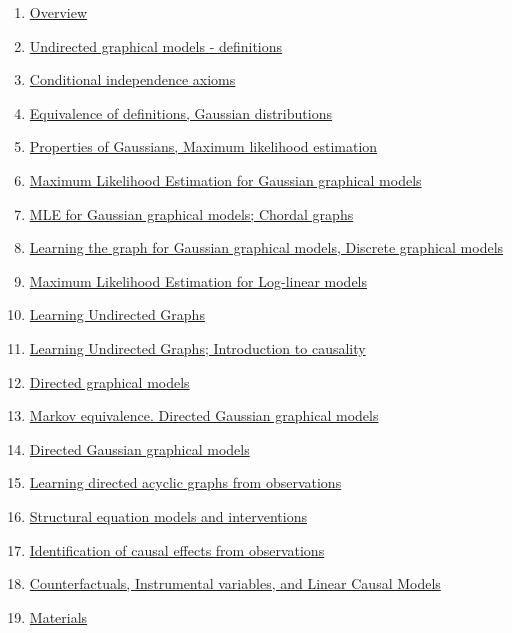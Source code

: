 \documentclass[11pt]{article}
\begin{document}
\begin{enumerate}
	\item \href{https://mp.weixin.qq.com/s/5iQ3uhnDR9QftKlPvxRZXA}{Overview}	%
	\item \href{https://mp.weixin.qq.com/s/qgy3DL0UQhDu8pzOWQ6Flg}{Undirected  graphical models - definitions}	%
	\item \href{https://mp.weixin.qq.com/s/ItVy0-fagZ4JRCftNziHbA}{Conditional independence axioms}	%
	\item \href{https://mp.weixin.qq.com/s/leZTPUh9iLrExCov0nIO7Q}{Equivalence of definitions, Gaussian distributions}	%
	\item \href{https://mp.weixin.qq.com/s/jdwikjZug7JxeTsQdCZd_QL}{Properties of Gaussians, Maximum likelihood estimation}	%
	\item \href{https://mp.weixin.qq.com/s/ftYULq-m_-c97a9lI1LsVQ}{Maximum Likelihood Estimation for Gaussian graphical models}	%
	\item \href{https://mp.weixin.qq.com/s/PEvf_utRW4bQ74-Fx4PNqw}{MLE for Gaussian graphical models; Chordal graphs}	%
	\item \href{https://mp.weixin.qq.com/s/ZjsU_or-nT61znCeaKYEKg}{Learning the graph for Gaussian graphical models, Discrete graphical models}	%
	\item \href{https://mp.weixin.qq.com/s/S1MeH0zFxD8yNz9bvtk1sw}{Maximum Likelihood Estimation for Log-linear models}	%
	\item \href{https://mp.weixin.qq.com/s/2iqheQlQRTL1_nWRQ5h0sA}{Learning Undirected Graphs}	%
	\item \href{https://mp.weixin.qq.com/s/4FoiOqfZ1cSuL9-Yd0sGig}{Learning Undirected Graphs; Introduction to causality}	%
	\item \href{https://mp.weixin.qq.com/s/4BLgHEC5JiUVpRfHtMm8LA}{Directed graphical models}	%
	\item \href{https://mp.weixin.qq.com/s/ki4Ekny3bQ-guBFAe8GPrg}{Markov equivalence. Directed Gaussian graphical models}	%
	\item \href{https://mp.weixin.qq.com/s/Kl9G9VgNFoTA-yDUyN9oTw}{Directed Gaussian graphical models}	%
	\item \href{https://mp.weixin.qq.com/s/UzWR9RTlIGxMUM-hjIj3iw}{Learning directed acyclic graphs from observations}	%
	\item \href{https://mp.weixin.qq.com/s/yz4KqX1c1dmxZ6SYxGHDGg}{Structural equation models and interventions}	%
	\item \href{https://mp.weixin.qq.com/s/2sGNtFsgCa4Gjd6a_gYqrQ}{Identification of causal effects from observations}	%
	\item \href{https://mp.weixin.qq.com/s/XwNMIs1kBna8qDFazSgYxA}{Counterfactuals, Instrumental variables, and Linear Causal Models}	%
	\item \href{https://pan.baidu.com/s/1XHMpncVrOutBQJzpr7fr1A}{Materials}
\end{enumerate}
\end{document}
